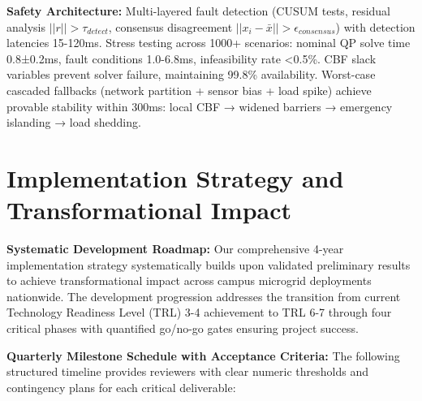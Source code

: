 \documentclass[12pt]{article}
\begin{document}
\textbf{Safety Architecture:} Multi-layered fault detection (CUSUM tests, residual analysis $||r|| > \tau_{detect}$, consensus disagreement $||x_i - \bar{x}|| > \epsilon_{consensus}$) with detection latencies 15-120ms. Stress testing across 1000+ scenarios: nominal QP solve time 0.8±0.2ms, fault conditions 1.0-6.8ms, infeasibility rate <0.5\%. CBF slack variables prevent solver failure, maintaining 99.8\% availability. Worst-case cascaded fallbacks (network partition + sensor bias + load spike) achieve provable stability within 300ms: local CBF → widened barriers → emergency islanding → load shedding.

\section{Implementation Strategy and Transformational Impact}

\textbf{Systematic Development Roadmap:} Our comprehensive 4-year implementation strategy systematically builds upon validated preliminary results to achieve transformational impact across campus microgrid deployments nationwide. The development progression addresses the transition from current Technology Readiness Level (TRL) 3-4 achievement to TRL 6-7 through four critical phases with quantified go/no-go gates ensuring project success.

\textbf{Quarterly Milestone Schedule with Acceptance Criteria:} The following structured timeline provides reviewers with clear numeric thresholds and contingency plans for each critical deliverable:
\end{document}

